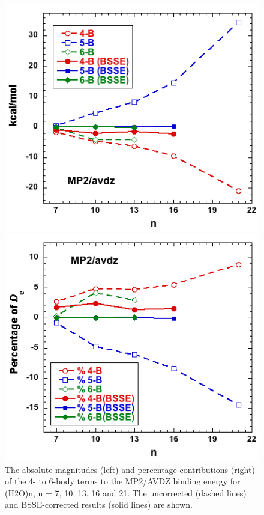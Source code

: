 \documentclass [11pt, proquest] {uwthesis}[2020/02/24]
\begin{document}
\begin{figure}[t]
\uwsinglespace
\begin{center}
\begin{minipage}{0.45\textwidth}
\includegraphics[width=.9\textwidth]{Figures/Chapter_2/4_B_6_B_vs_n.jpg}
\end{minipage}
\begin{minipage}{0.45\textwidth}
\includegraphics[width=.9\textwidth]{Figures/Chapter_2/4_B_6_B_perc_vs_n.jpg}
\end{minipage}
\end{center}
\label{fig:MBE_I_F5}
\caption[temp]{The absolute magnitudes (left) and percentage contributions (right) of the 4- to 6-body terms to the MP2/AVDZ binding energy for (H2O)n, n = 7, 10, 13, 16 and 21. The uncorrected (dashed lines) and BSSE-corrected results (solid lines) are shown.}
\end{figure}
\end{document}
